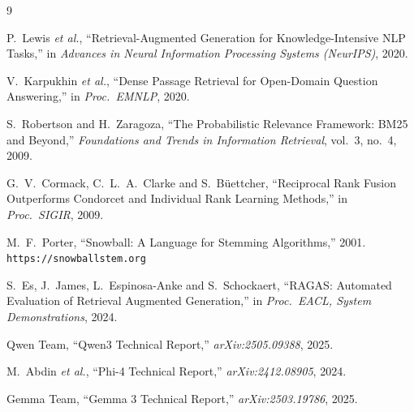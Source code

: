 \documentclass[11pt]{article}
\renewcommand{\_}{\textunderscore\allowbreak}
\begin{document}
\begin{thebibliography}{9}

P.~Lewis \textit{et al.},
``Retrieval-Augmented Generation for Knowledge-Intensive NLP Tasks,''
in \textit{Advances in Neural Information Processing Systems (NeurIPS)}, 2020.

V.~Karpukhin \textit{et al.},
``Dense Passage Retrieval for Open-Domain Question Answering,''
in \textit{Proc.\ EMNLP}, 2020.

S.~Robertson and H.~Zaragoza,
``The Probabilistic Relevance Framework: BM25 and Beyond,''
\textit{Foundations and Trends in Information Retrieval}, vol.~3, no.~4, 2009.

G.~V.~Cormack, C.~L.~A.~Clarke and S.~B\"uettcher,
``Reciprocal Rank Fusion Outperforms Condorcet and Individual Rank Learning Methods,''
in \textit{Proc.\ SIGIR}, 2009.

M.~F.~Porter,
``Snowball: A Language for Stemming Algorithms,''
2001. \texttt{https://snowballstem.org}

S.~Es, J.~James, L.~Espinosa-Anke and S.~Schockaert,
``RAGAS: Automated Evaluation of Retrieval Augmented Generation,''
in \textit{Proc.\ EACL, System Demonstrations}, 2024.

Qwen Team,
``Qwen3 Technical Report,''
\textit{arXiv:2505.09388}, 2025.

M.~Abdin \textit{et al.},
``Phi-4 Technical Report,''
\textit{arXiv:2412.08905}, 2024.

Gemma Team,
``Gemma 3 Technical Report,''
\textit{arXiv:2503.19786}, 2025.

\end{thebibliography}
\end{document}
